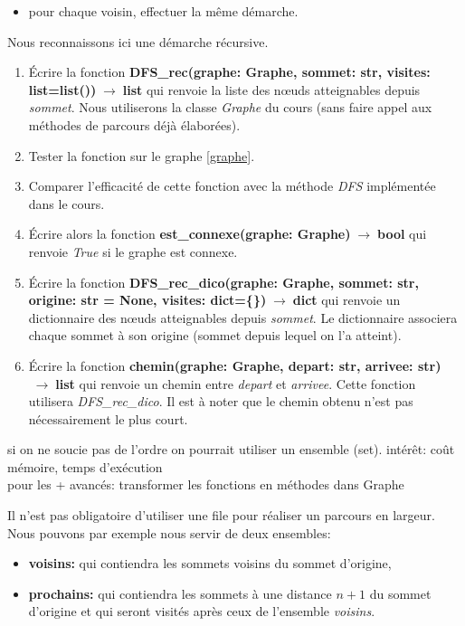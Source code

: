 \documentclass[a4paper,11pt]{article}
\begin{document}
\begin{Form}
\begin{exo}
\begin{itemize}
\begin{itemize}
\item pour chaque voisin, effectuer la même démarche.
\end{itemize}
\end{itemize}
Nous reconnaissons ici une démarche récursive.
\begin{enumerate}
\item Écrire la fonction \textbf{DFS\_rec(graphe: Graphe, sommet: str, visites: list=list())$\;\rightarrow\;$list} qui renvoie la liste des nœuds atteignables depuis \emph{sommet}. Nous utiliserons la classe \emph{Graphe} du cours (sans faire appel aux méthodes de parcours déjà élaborées).
\item Tester la fonction sur le graphe \ref{graphe}.
\item Comparer l'efficacité de cette fonction avec la méthode \emph{DFS} implémentée dans le cours.
\item Écrire alors la fonction \textbf{est\_connexe(graphe: Graphe)$\;\rightarrow\;$bool} qui renvoie \emph{True} si le graphe est connexe.
\item Écrire la fonction \textbf{DFS\_rec\_dico(graphe: Graphe, sommet: str, origine: str = None, visites: dict=\{\})$\;\rightarrow\;$dict} qui renvoie un dictionnaire des nœuds atteignables depuis \emph{sommet}. Le dictionnaire associera chaque sommet à son origine (sommet depuis lequel on l'a atteint).
\item Écrire la fonction \textbf{chemin(graphe: Graphe, depart: str, arrivee: str)$\;\rightarrow\;$list} qui renvoie un chemin entre \emph{depart} et \emph{arrivee}. Cette fonction utilisera \emph{DFS\_rec\_dico}. Il est à noter que le chemin obtenu n'est pas nécessairement le plus court.
\end{enumerate}
\begin{commentprof}
si on ne soucie pas de l'ordre on pourrait utiliser un ensemble (set). intérêt: coût mémoire, temps d'exécution\\
pour les + avancés: transformer les fonctions en méthodes dans Graphe
\end{commentprof}
\end{exo}
\begin{exo}
Il n'est pas obligatoire d'utiliser une file pour réaliser un parcours en largeur. Nous pouvons par exemple nous servir de deux ensembles:
\begin{itemize}
\item \textbf{voisins:} qui contiendra les sommets voisins du sommet d'origine,
\item \textbf{prochains:} qui contiendra les sommets à une distance $n+1$ du sommet d'origine et qui seront visités après ceux de l'ensemble \emph{voisins}.

\end{itemize}
\end{exo}
\end{Form}
\end{document}
